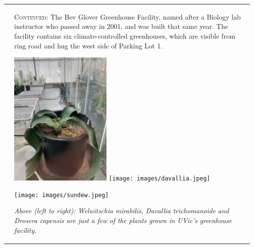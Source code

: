 \documentclass[fleqn]{article}
\begin{document}
\begin{tabular}{@{}
                         p{}%
		         @{\hspace{.04\columnwidth}}%
		         p{}%
		         @{}%
}
&\large
\lettrine[lines=3]{}{Continued}: The Bev Glover Greenhouse Facility, named after a Biology lab instructor who passed away in 2001, and was built that same year. The facility contains six climate-controlled greenhouses, which are visible from ring road and hug the west side of Parking Lot 1. \linebreak\
\par\medskip
\includegraphics[width=5cm]{images/welwitschia.jpeg}\hfill
\texttt{[image: images/davallia.jpeg]}\hfill
\par\bigskip
\texttt{[image: images/sundew.jpeg]}\hfill
\sffamily\lite\fontsize{10}{10}\selectfont\raggedright 
\par\bigskip
\emph{Above (left to right): \emph{Welwitschia mirabilis}, \emph{Davallia trichomanoide} and \emph{Drosera capensis} are just a few of the plants grown in UVic's greenhouse facility.}
\vfill
\end{tabular}
\clearpage
\end{document}
